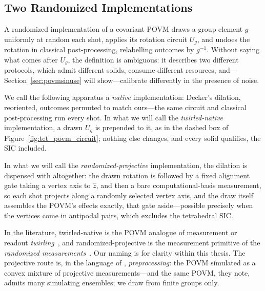 \documentclass[11pt, oneside, openany]{scrbook}
\begin{document}
\subsection{Two Randomized Implementations} \label{subsec:randomized-implementations}

A randomized implementation of a covariant POVM draws a group element $g$ uniformly at random each shot, applies its rotation circuit $U_g$, and undoes the rotation in classical post-processing, relabelling outcomes by $g^{-1}$. Without saying what comes after $U_g$, the definition is ambiguous: it describes two different protocols, which admit different solids, consume different resources, and---Section~\ref{sec:povmsinuse} will show---calibrate differently in the presence of noise.

We call the following apparatus a \textit{native} implementation: Decker's dilation, reoriented, outcomes permuted to match ours---the same circuit and classical post-processing run every shot. In what we will call the \textit{twirled-native} implementation, a drawn $U_g$ is prepended to it, as in the dashed box of Figure~\ref{fig:tet_povm_circuit}; nothing else changes, and every solid qualifies, the SIC included.

In what we will call the \textit{randomized-projective} implementation, the dilation is dispensed with altogether: the drawn rotation is followed by a fixed alignment gate taking a vertex axis to $\hat{z}$, and then a bare computational-basis measurement, so each shot projects along a randomly selected vertex axis, and the draw itself assembles the POVM's effects exactly, that gate aside---possible precisely when the vertices come in antipodal pairs, which excludes the tetrahedral SIC.

In the literature, twirled-native is the POVM analogue of measurement or readout \textit{twirling}~\cite{berg2022modelfreereadouterrormitigation}, and randomized-projective is the measurement primitive of the \textit{randomized measurements}~\cite{elben2022randomizedmeasurementtoolbox}. Our naming is for clarity within this thesis. The projective route is, in the language of \textcite[App.~D]{nguyen2022optimisingshadowtomography}, \textit{preprocessing}: the POVM simulated as a convex mixture of projective measurements---and the same POVM, they note, admits many simulating ensembles; we draw from finite groups only.
\end{document}
